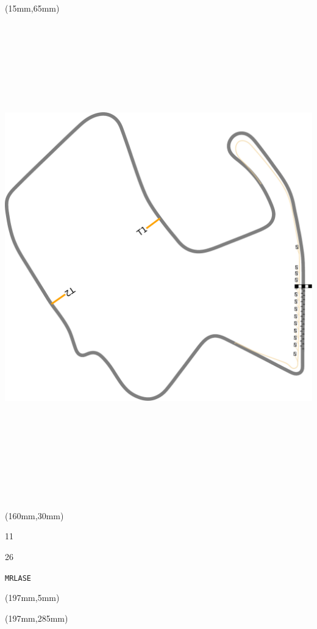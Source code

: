\begin{textblock*}{185mm}(15mm,65mm)%
\centering
\mbox{\includegraphics[width=185mm,height=210mm,keepaspectratio]{PT/MRLASE.pdf}}
\end{textblock*}
\begin{textblock*}{40mm}(160mm,30mm)%
\Large
\par{} 
\par11 
\par26 
\par\hfill\tiny\tt MRLASE\\
\end{textblock*}
\begin{textblock*}{20mm}(197mm,5mm)%
\fbox{\thepage}
\label{MRLASE}
\end{textblock*}
\begin{textblock*}{20mm}(197mm,285mm)%
\fbox{\thepage}
\end{textblock*}

